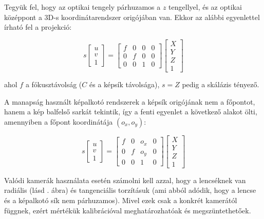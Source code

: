 Tegyük fel, hogy az optikai tengely párhuzamos a $z$ tengellyel, és az optikai középpont a 3D-s koordinátarendszer origójában van. Ekkor az alábbi egyenlettel írható fel a projekció:

\[s \left[\begin{array}{c}
u \\ 
v \\
1
\end{array}\right] = \left[\begin{array}{cccc}
f & 0 & 0 & 0 \\ 
0 & f & 0 & 0\\
0 & 0 & 1 & 0
\end{array}\right] \left[\begin{array}{c}
X \\ 
Y \\
Z \\
1
\end{array}\right]\]

ahol $f$ a fókusztávolság ($C$ és a képsík távolsága), $s = Z$ pedig a skálázis tényező.

A manapság használt képalkotó rendszerek a képsík origójának nem a főpontot, hanem a kép balfelső sarkát tekintik, így a fenti egyenlet a következő  alakot ölti, amennyiben a főpont koordinátája $(o_x, o_y)$:

\[s \left[\begin{array}{c}
u \\ 
v \\
1
\end{array}\right] = \left[\begin{array}{cccc}
f & 0 & o_x & 0 \\ 
0 & f & o_y & 0 \\
0 & 0 & 1 & 0
\end{array}\right] \left[\begin{array}{c}
X \\ 
Y \\
Z \\
1
\end{array}\right]\]

Valódi kamerák használata esetén számolni kell azzal, hogy a lencséknek van radiális (lásd . ábra) és tangenciális torzításuk (ami abból adódik, hogy a lencse és a képalkotó sík nem párhuzamos). Mivel ezek csak a konkrét kamerától függnek, ezért mértékük kalibrációval meghatározhatóak és megszüntethetőek. 

